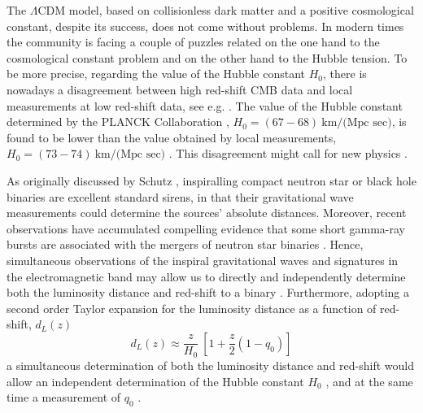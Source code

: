 \documentclass[aps,prd,amsmath,amssymb]{revtex4}
\begin{document}
\smallskip

The $\Lambda$CDM model, based on collisionless dark matter and a positive cosmological constant, despite its success, does not come without problems. In modern times the community is facing a couple of puzzles related on the one hand to the cosmological constant problem \cite{zeldovich,weinberg} and on the other hand to the Hubble tension. To be more precise, regarding the value of the Hubble constant $H_0$, there is nowadays a disagreement between high red-shift CMB data and local measurements at low red-shift data, see e.g. \cite{tension,tension1,tension2,tension3}. The value of the Hubble constant determined by the PLANCK Collaboration \cite{planck1,planck2}, $H_0 = (67-68)~\text{km/(Mpc  sec)}$, is found to be lower than the value obtained by local measurements, $H_0 = (73-74)~\text{km/(Mpc sec)}$ \cite{hubble,recent}. This disagreement  might call for new physics \cite{newphysics,earlyDE,ben}.

\smallskip

As originally discussed by Schutz \cite{sirens}, inspiralling compact neutron star or black hole binaries are excellent standard sirens, in that their gravitational wave measurements could determine the sources’ absolute distances. 
Moreover, recent observations have accumulated compelling evidence that some short gamma-ray bursts
are associated with the mergers of neutron star binaries \cite{Ref1}. Hence, simultaneous observations of the inspiral gravitational waves and signatures in the electromagnetic band may allow us to directly and independently determine both 
the luminosity distance and red-shift to a binary \cite{Ref1}. Furthermore, adopting a second order Taylor expansion for 
the luminosity distance as a function of red-shift, $d_L(z)$ \cite{hubble,Ref2} 
\begin{equation}
d_L(z) \approx \frac{z}{H_0} \: \left[ 1+\frac{z}{2} (1-q_0) \right]
\end{equation}
a simultaneous determination of both the luminosity distance and red-shift would allow an independent determination of the Hubble constant $H_0$ \cite{Abbott}, and at the same time a measurement of $q_0$ \cite{Ref2}.


\smallskip
\end{document}
